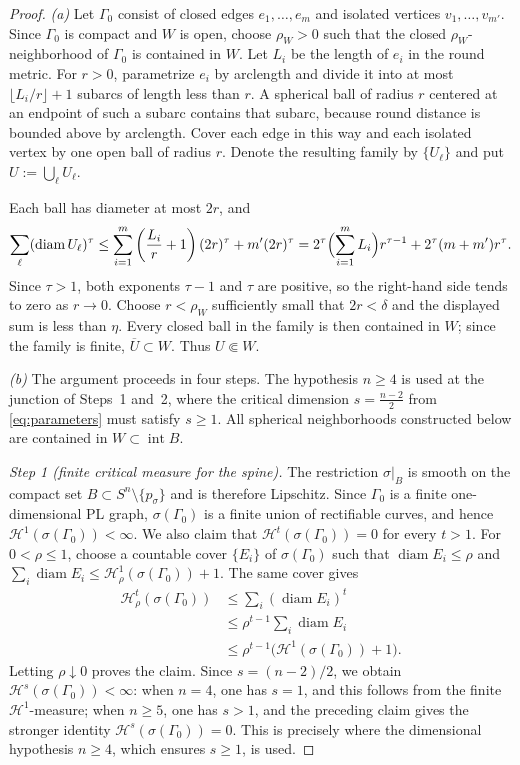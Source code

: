 \documentclass[12pt,oneside,a4paper]{article}
\theoremstyle{mytheorem}
\theoremstyle{remark}
\theoremstyle{definition}
\begin{document}
\begin{proof}
\emph{(a)} Let $\Gamma_0$ consist of closed edges
$e_1,\dots,e_m$ and isolated vertices $v_1,\dots,v_{m'}$. Since
$\Gamma_0$ is compact and $W$ is open, choose $\rho_W>0$ such that the
closed $\rho_W$-neighborhood of $\Gamma_0$ is contained in $W$. Let
$L_i$ be the length of $e_i$ in the round metric. For $r>0$,
parametrize $e_i$ by arclength and divide it into at most
$\lfloor L_i/r\rfloor+1$ subarcs of length less than $r$. A spherical
ball of radius $r$ centered at an endpoint of such a subarc contains
that subarc, because round distance is bounded above by arclength.
Cover each edge in this way and each isolated vertex by one open ball
of radius $r$. Denote the resulting family by
$\{U_\ell\}$ and put $U:=\bigcup_\ell U_\ell$.

Each ball has diameter at most $2r$, and
\[
 \sum_\ell (\operatorname{diam} U_\ell)^\tau
 \le \sum_{i=1}^m \left( \frac{L_i}{r} + 1 \right) (2r)^\tau
      + m'(2r)^\tau
 = 2^\tau \Bigl( \sum_{i=1}^m L_i \Bigr) r^{\tau-1}
      + 2^\tau (m+m')r^\tau.
\]
Since $\tau>1$, both exponents $\tau-1$ and $\tau$ are positive, so the
right-hand side tends to zero as $r\to0$. Choose
$r<\rho_W$ sufficiently small that $2r<\delta$ and the displayed sum is
less than $\eta$. Every closed ball in the family is then contained in
$W$; since the family is finite, $\overline U\subset W$. Thus
$U\Subset W$.

\emph{(b)} The argument proceeds in four steps. The hypothesis $n\ge4$
is used at the junction of Steps~1 and~2, where the critical dimension
$s=\frac{n-2}{2}$ from \eqref{eq:parameters} must satisfy $s\ge1$.
All spherical neighborhoods constructed below are contained in
$W\subset\operatorname{int}B$.

\smallskip\noindent\emph{Step 1 (finite critical measure for the spine).}
The restriction $\sigma|_B$ is smooth on the compact set
$B\subset S^n\setminus\{p_\sigma\}$ and is therefore Lipschitz. Since
$\Gamma_0$ is a finite one-dimensional PL graph,
$\sigma(\Gamma_0)$ is a finite union of rectifiable curves, and hence
$\mathcal{H}^1(\sigma(\Gamma_0))<\infty$. We also claim that
$\mathcal{H}^t(\sigma(\Gamma_0))=0$ for every $t>1$. For $0<\rho\le1$,
choose a countable cover $\{E_i\}$ of $\sigma(\Gamma_0)$ such that
$\operatorname{diam}E_i\le\rho$ and
$\sum_i\operatorname{diam}E_i\le
\mathcal{H}^1_\rho(\sigma(\Gamma_0))+1$.
The same cover gives
\[
\begin{aligned}
 \mathcal{H}^t_\rho(\sigma(\Gamma_0))
 &\le \sum_i(\operatorname{diam}E_i)^t \\
 &\le \rho^{t-1}\sum_i\operatorname{diam}E_i \\
 &\le \rho^{t-1}
 \bigl(\mathcal{H}^1(\sigma(\Gamma_0))+1\bigr).
\end{aligned}
\]
Letting $\rho\downarrow0$ proves the claim.  Since $s=(n-2)/2$, we obtain
$\mathcal{H}^s(\sigma(\Gamma_0))<\infty$: when $n=4$, one has $s=1$, and
this follows from the finite $\mathcal{H}^1$-measure; when $n\ge5$, one
has $s>1$, and the preceding claim gives the stronger identity
$\mathcal{H}^s(\sigma(\Gamma_0))=0$.  This is precisely
where the dimensional hypothesis $n\ge4$, which ensures $s\ge1$, is
used.


\end{proof}
\end{document}
